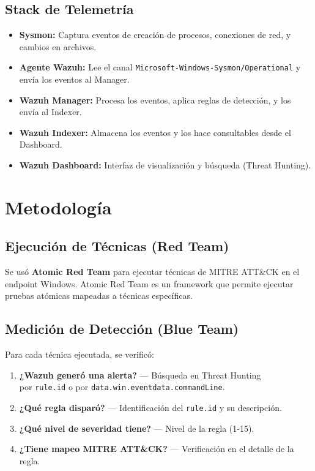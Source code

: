 \documentclass[11pt,a4paper]{article}
\begin{document}
	\subsection{Stack de Telemetría}
	
	\begin{itemize}[leftmargin=1.5em]
		\item \textbf{Sysmon:} Captura eventos de creación de procesos, conexiones de red, y cambios en archivos.
		\item \textbf{Agente Wazuh:} Lee el canal \texttt{Microsoft-Windows-Sysmon/Operational} y envía los eventos al Manager.
		\item \textbf{Wazuh Manager:} Procesa los eventos, aplica reglas de detección, y los envía al Indexer.
		\item \textbf{Wazuh Indexer:} Almacena los eventos y los hace consultables desde el Dashboard.
		\item \textbf{Wazuh Dashboard:} Interfaz de visualización y búsqueda (Threat Hunting).
	\end{itemize}
	
	\section{Metodología}
	
	\subsection{Ejecución de Técnicas (Red Team)}
	
	Se usó \textbf{Atomic Red Team} para ejecutar técnicas de MITRE ATT\&CK en el endpoint Windows. Atomic Red Team es un framework que permite ejecutar pruebas atómicas mapeadas a técnicas específicas.
	
	\subsection{Medición de Detección (Blue Team)}
	
	Para cada técnica ejecutada, se verificó:
	
	\begin{enumerate}[leftmargin=1.5em]
		\item \textbf{¿Wazuh generó una alerta?} --- Búsqueda en Threat Hunting \\ por \texttt{rule.id} o por \texttt{data.win.eventdata.commandLine}.
		\item \textbf{¿Qué regla disparó?} --- Identificación del \texttt{rule.id} y su descripción.
		\item \textbf{¿Qué nivel de severidad tiene?} --- Nivel de la regla (1-15).
		\item \textbf{¿Tiene mapeo MITRE ATT\&CK?} --- Verificación en el detalle de la regla.
	\end{enumerate}
	
\end{document}
